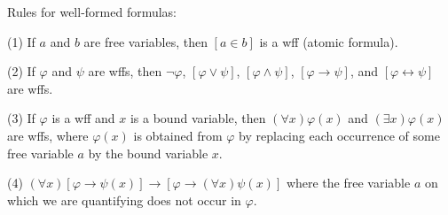 Rules for well-formed formulas:

(1) If $a$ and $b$ are free variables, then $[a \in b]$ is a wff (atomic formula).

(2) If $\varphi$ and $\psi$ are wffs, then $\neg \varphi$, $[\varphi \lor \psi]$, $[\varphi \land \psi]$, $[\varphi \rightarrow \psi]$, and $[\varphi \leftrightarrow \psi]$ are wffs.

(3) If $\varphi$ is a wff and $x$ is a bound variable, then $(\forall x)\varphi(x)$ and $(\exists x)\varphi(x)$ are wffs, where $\varphi(x)$ is obtained from $\varphi$ by replacing each occurrence of some free variable $a$ by the bound variable $x$.

(4) $(\forall x)[\varphi \rightarrow \psi(x)] \rightarrow [\varphi \rightarrow (\forall x)\psi(x)]$ where the free variable $a$ on which we are quantifying does not occur in $\varphi$.
